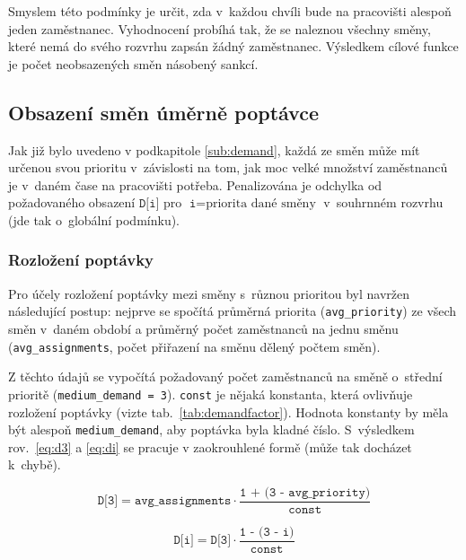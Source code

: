\documentclass[a4paper,11pt,openany,twoside]{book}
\begin{document}
Smyslem této podmínky je určit, zda v~každou chvíli bude na pracovišti alespoň jeden zaměstnanec. Vyhodnocení probíhá tak, že se naleznou všechny směny, které nemá do svého rozvrhu zapsán žádný zaměstnanec. Výsledkem cílové funkce je počet neobsazených směn násobený sankcí.

\subsection{Obsazení směn úměrně poptávce}
Jak již bylo uvedeno v podkapitole \ref{sub:demand}, každá ze směn může mít určenou svou prioritu v~závislosti na tom, jak moc velké množství zaměstnanců je v~daném čase na pracovišti potřeba. Penalizována je odchylka od požadovaného obsazení $\texttt{D[i]}$ pro $\texttt{i} = \mbox{priorita dané směny}$ v~souhrnném rozvrhu (jde tak o~globální podmínku).


\subsubsection{Rozložení poptávky}
Pro účely rozložení poptávky mezi směny s~různou prioritou byl navržen následující postup: nejprve se spočítá průměrná priorita (\texttt{avg\_priority}) ze všech směn v~daném období a průměrný počet zaměstnanců na jednu směnu (\texttt{avg\_assignments}, počet přiřazení na směnu dělený počtem směn).

Z těchto údajů se vypočítá požadovaný počet zaměstnanců na směně o~střední prioritě (\texttt{medium\_demand = 3}). \texttt{const} je nějaká konstanta, která ovlivňuje rozložení poptávky (vizte tab.~\ref{tab:demandfactor}). Hodnota konstanty by měla být alespoň \texttt{medium\_demand}, aby poptávka byla kladné číslo. S~výsledkem rov.~\ref{eq:d3} a \ref{eq:di} se pracuje v zaokrouhlené formě (může tak docházet k~chybě).

\begin{equation}
	\label{eq:d3}
	\texttt{D[3]} = \texttt{avg\_assignments} \cdot \frac{\texttt{1 + (3 - avg\_priority})}{\texttt{const}}
\end{equation}

\begin{equation}
	\label{eq:di}
	\texttt{D[i]} = \texttt{D[3]} \cdot \frac{\texttt{1 - (3 - i})}{\texttt{const}}
\end{equation}
\end{document}
